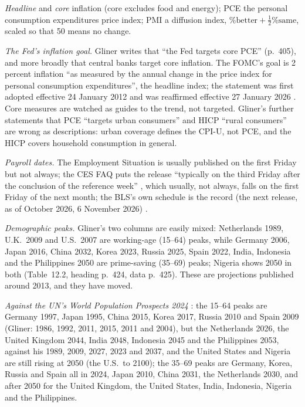 \begin{qfdefinition}
 \emph{Headline} and \emph{core} inflation (core excludes food and energy); PCE the personal consumption expenditures price index; PMI a diffusion index, $\%\text{better}+\tfrac12\%\text{same}$, scaled so that 50 means no change.

 \emph{The Fed's inflation goal.} Gliner writes that ``the Fed targets core PCE'' (p.~405), and more broadly that central banks target core inflation. The FOMC's goal is 2 percent inflation ``as measured by the annual change in the price index for personal consumption expenditures'', the headline index; the statement was first adopted effective 24 January 2012 and was reaffirmed effective 27 January 2026 \citep[Statement on Longer-Run Goals and Monetary Policy Strategy, pp.~1--2]{fomc-longer-run-goals}. Core measures are watched as guides to the trend, not targeted. Gliner's further statements that PCE ``targets urban consumers'' and HICP ``rural consumers'' are wrong as descriptions: urban coverage defines the CPI-U, not PCE, and the HICP covers household consumption in general.

\emph{Payroll dates.} The Employment Situation is usually published on the first Friday but not always; the CES FAQ puts the release ``typically on the third Friday after the conclusion of the reference week'' \citep[Data Overview, Q8]{bls-ces-faq}, which usually, not always, falls on the first Friday of the next month; the BLS's own schedule is the record (the next release, as of October 2026, 6 November 2026) \citep[program page]{bls-ces-page}.

 \emph{Demographic peaks.} Gliner's two columns are easily mixed: Netherlands 1989, U.K.\ 2009 and U.S.\ 2007 are working-age (15--64) peaks, while Germany 2006, Japan 2016, China 2032, Korea 2023, Russia 2025, Spain 2022, India, Indonesia and the Philippines 2050 are prime-saving (35--69) peaks; Nigeria shows 2050 in both (Table~12.2, heading p.~424, data p.~425). These are projections published around 2013, and they have moved.

\emph{Against the UN's World Population Prospects 2024} \citep[file \nolinkurl{WPP2024_PopulationByAge5GroupSex_Medium}]{un-wpp-2024}: the 15--64 peaks are Germany 1997, Japan 1995, China 2015, Korea 2017, Russia 2010 and Spain 2009 (Gliner: 1986, 1992, 2011, 2015, 2011 and 2004), but the Netherlands 2026, the United Kingdom 2044, India 2048, Indonesia 2045 and the Philippines 2053, against his 1989, 2009, 2027, 2023 and 2037, and the United States and Nigeria are still rising at 2050 (the U.S.\ to 2100); the 35--69 peaks are Germany, Korea, Russia and Spain all in 2024, Japan 2010, China 2031, the Netherlands 2030, and after 2050 for the United Kingdom, the United States, India, Indonesia, Nigeria and the Philippines.


\end{qfdefinition}
